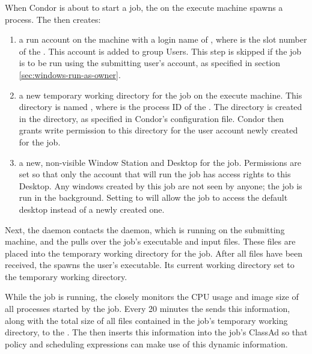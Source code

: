 When Condor is about to start a job, the  on the execute
machine spawns a  process.  The  then
creates:
\begin{enumerate}

\item a run account on the machine with a login name of
, where  is the slot number of the
.  This account is added to group Users.  This step is
skipped if the job is to be run using the submitting user's account,
as specified in section \ref{sec:windows-run-as-owner}.

\item a new temporary working directory for the job on the execute machine.
This directory is
named , where  is the process ID of the 
.
The directory is created in the  directory,
as specified in Condor's configuration file.  
Condor then grants write
permission to this directory for the user account newly created for the
job.

\item a new, non-visible Window Station and Desktop for the job.
Permissions are set so that only the account that will run the job has
access rights to this Desktop.  Any windows created by this job are
not seen by anyone; the job is run in the background.
Setting  to 
will allow the job to access the
default desktop instead of a newly created one.

\end{enumerate}

Next, the  daemon contacts the  daemon, 
which is running on the submitting machine, 
and the  pulls over the job's executable and input files.
These files are placed into the temporary working directory
for the job.  After all files have been received, the  spawns
the user's executable.  Its current working directory set to the
temporary working directory.

While the job is running, the  closely monitors the CPU
usage and image size of all processes started by the job.
Every 20 minutes the  sends this information,
along with the total size of all files contained in the job's
temporary working directory, to the .
The  then
inserts this information into the job's ClassAd so that policy and
scheduling expressions can make use of this dynamic information.

